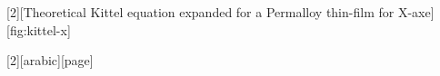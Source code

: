 
\makeatletter
\renewcommand\@makefnmark{\hbox{\@textsuperscript{\normalfont\color{red-clean}\@thefnmark}}}
\renewcommand\@makefntext[1]{%
	\parindent 1em\noindent
	\hb@xt@1.8em{%
		\hss\@textsuperscript{\normalfont\@thefnmark}}#1}
\makeatother


\newcommand{\listofpublicationsname}{List of Publications}


[2][Theoretical Kittel equation expanded for a Permalloy thin-film for X-axe][fig:kittel-x]{
	\vspace{-0.5cm}
}

\newcommand{\tikzimagefigure}[2]{

	\begin{figure}[H]
		\centering
		#1
		\captionsetup{justification=raggedright, singlelinecheck=true}
		\caption{#2}
	\end{figure}
}

\newcommand{\tikzimagefigurelabel}[3]{

	\begin{figure}[H]
		\centering
		#2
		\captionsetup{justification=raggedright, singlelinecheck=true}
		\caption{#3}
		\ifthenelse{\equal{#1}{}}{}{\label{#1}}
	\end{figure}
}


[2][arabic][page] {

	\setcounter{savepagearabic}{\value{#2}}
	\setcounter{#2}{\value{savepagearabic}}
}




